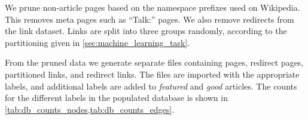 \begin{center}
\end{center}

We prune non-article pages based on the namespace prefixes used on Wikipedia. This removes meta pages such as \enquote{Talk:} pages. We also remove redirects from the link dataset. Links are split into three groups randomly, according to the partitioning given in \cref{sec:machine_learning_task}. 

From the pruned data we generate separate files containing pages, redirect pages, partitioned links, and redirect links.  The files are imported with the appropriate labels, and additional labels are added to \emph{featured} and \emph{good} articles.
 The counts for the different labels in the populated database is shown in \cref{tab:db_counts_nodes,tab:db_counts_edges}.

